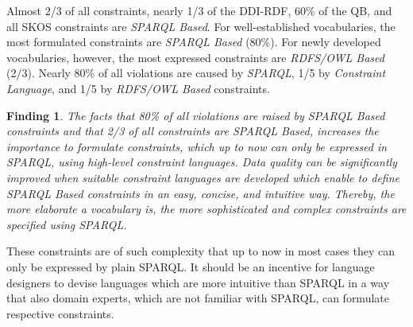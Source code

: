 \documentclass[conference]{IEEEtran}
\newtheorem{hyp}{Finding}
\begin{document}
Almost 2/3 of all constraints, nearly 1/3 of the DDI-RDF, 60\% of the QB, and all SKOS constraints are \emph{SPARQL Based}. For well-established vocabularies, the most formulated constraints are \emph{SPARQL Based} (80\%). For newly developed vocabularies, however, the most expressed constraints are \emph{RDFS/OWL Based} (2/3). 
%
Nearly 80\% of all violations are caused by \emph{SPARQL}, 1/5 by \emph{Constraint Language}, and 1/5 by \emph{RDFS/OWL Based} constraints.
\begin{hyp}
The facts that 80\% of all violations are raised by SPARQL Based constraints and that 2/3 of all constraints are SPARQL Based, increases the importance to formulate constraints, which up to now can only be expressed in SPARQL, using high-level constraint languages. Data quality can be significantly improved when suitable constraint languages are developed which enable to define SPARQL Based constraints in an easy, concise, and intuitive way. Thereby, the more elaborate a vocabulary is, the more sophisticated and complex constraints are specified using SPARQL. 
\end{hyp} 

These constraints are of such complexity that up to now in most cases they can only be expressed by plain SPARQL. It should be an incentive for language designers to devise languages which are more intuitive than SPARQL in a way that also domain experts, which are not familiar with SPARQL, can formulate respective constraints.


\end{document}
